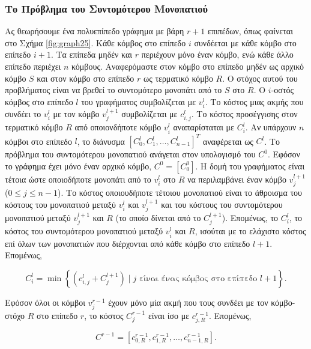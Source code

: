 \documentclass[12pt,a4paper]{article} %
\begin{document}
{{\subsubsection{Το Πρόβλημα του Συντομότερου Μονοπατιού}

Ας θεωρήσουμε ένα πολυεπίπεδο γράφημα με βάρη $r + 1$ επιπέδων,
όπως φαίνεται στο Σχήμα \ref{fig:graph25}. Κάθε κόμβος στο επίπεδο $i$ συνδέεται
με κάθε κόμβο στο επίπεδο $i + 1$. Τα επίπεδα μηδέν και $r$ περιέχουν
μόνο έναν κόμβο, ενώ κάθε άλλο επίπεδο περιέχει $n$ κόμβους.
Αναφερόμαστε στον κόμβο στο επίπεδο μηδέν ως αρχικό κόμβο $S$ και
στον κόμβο στο επίπεδο $r$ ως τερματικό κόμβο $R$. Ο στόχος αυτού
του προβλήματος είναι να βρεθεί το συντομότερο μονοπάτι από το $S$
στο $R$. Ο $i$-οστός κόμβος στο επίπεδο $l$ του γραφήματος συμβολίζεται
με $v_i^l$. Το κόστος μιας ακμής που συνδέει το $v_i^l$ με τον κόμβο
$v_j^{l+1}$ συμβολίζεται με $c_{i,j}^l$. Το κόστος προσέγγισης στον
τερματικό κόμβο $R$ από οποιονδήποτε κόμβο $v_i^l$ αναπαρίσταται με
$C_i^l$. Αν υπάρχουν $n$ κόμβοι στο επίπεδο $l$, το διάνυσμα
$[C_0^l, C_1^l, \ldots, C_{n-1}^l]^T$ αναφέρεται ως $C^l$. Το
πρόβλημα του συντομότερου μονοπατιού ανάγεται στον υπολογισμό του $C^0$.
Εφόσον το γράφημα έχει μόνο έναν αρχικό κόμβο, $C^0 = [C_0^0]$. Η
δομή του γραφήματος είναι τέτοια ώστε οποιοδήποτε μονοπάτι από το $v_i^l$
στο $R$ να περιλαμβάνει έναν κόμβο $v_j^{l+1}$ ($0 \leq j \leq n-1$).
Το κόστος οποιουδήποτε τέτοιου μονοπατιού είναι το άθροισμα του
κόστους του μονοπατιού μεταξύ $v_i^l$ και $v_j^{l+1}$ και του κόστους
του συντομότερου μονοπατιού μεταξύ $v_j^{l+1}$ και $R$ (το οποίο
δίνεται από το $C_j^{l+1}$). Επομένως, το $C_i^l$, το κόστος του
συντομότερου μονοπατιού μεταξύ $v_i^l$ και $R$, ισούται με το
ελάχιστο κόστος επί όλων των μονοπατιών που διέρχονται από κάθε
κόμβο στο επίπεδο $l + 1$. Επομένως,

\begin{equation}
C_i^l = \min \left\{ (c_{i,j}^l + C_j^{l+1}) \mid j \text{ είναι ένας κόμβος στο επίπεδο } l + 1 \right\}.
\label{eq:relation13}
\end{equation}

Εφόσον όλοι οι κόμβοι $v_j^{r-1}$ έχουν μόνο μία ακμή που τους συνδέει με τον κόμβο-στόχο $R$ στο επίπεδο $r$, το κόστος $C_j^{r-1}$ είναι ίσο με $c_{j,R}^{r-1}$. Επομένως,

\begin{equation}
C^{r-1} = [c_{0,R}^{r-1}, c_{1,R}^{r-1}, \dots, c_{n-1,R}^{r-1}].
\label{eq:relation14}
\end{equation}
\vspace{0.3cm}

}}
\end{document}
